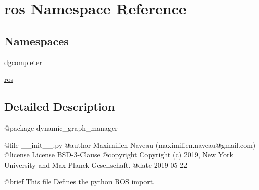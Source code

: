 \hypertarget{namespaceros}{}\section{ros Namespace Reference}
\label{namespaceros}
\subsection*{Namespaces}
\begin{DoxyCompactItemize}
\item 
 \hyperlink{namespaceros_1_1dgcompleter}{dgcompleter}
\item 
 \hyperlink{namespaceros_1_1ros}{ros}
\end{DoxyCompactItemize}


\subsection{Detailed Description}
\begin{DoxyVerb}@package dynamic_graph_manager

@file __init__.py
@author Maximilien Naveau (maximilien.naveau@gmail.com)
@license License BSD-3-Clause
@copyright Copyright (c) 2019, New York University and Max Planck Gesellschaft.
@date 2019-05-22

@brief This file Defines the python ROS import.\end{DoxyVerb}
 